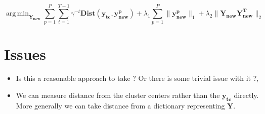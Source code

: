 \documentclass{sig-alternate}
\DeclareMathOperator*{\argmin}{arg\,min}
\begin{document}
\begin{equation}
\argmin_{\mathbf{Y_{new}}}  \sum_{p=1}^{P} \sum_{t=1}^{T-1} \gamma^{-t} \mathbf{Dist(y_{tc},y_{new}^{p})} + \lambda_1  \sum_{p=1}^{P} \| \mathbf{y_{new}^{p}} \|_{1} + \lambda_2 \| \mathbf{Y_{new}Y_{new}^{T}}\|_2
\end{equation}


\section{Issues}

\begin{itemize}
\item{ Is this a reasonable approach to take ? Or there is some trivial issue with it ?,} 
\item {We can measure distance from the cluster centers rather than the $\mathbf{y_{tc}}$ directly. More generally we can take distance from a dictionary representing $\mathbf{Y}$.}
\end{itemize}


%

\end{document}
